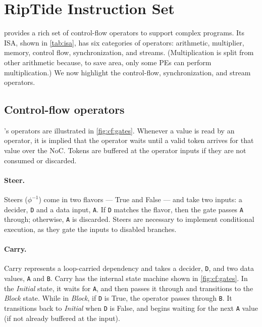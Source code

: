 \section{RipTide Instruction Set}
\label{sec:cf}



\riptide provides a rich set of control-flow operators to support complex programs.
% 
Its ISA, shown in \autoref{tab:isa}, has six categories of operators: arithmetic, multiplier, memory, control flow, synchronization, and streams.
%
(Multiplication is split from other arithmetic because, to save area, only some PEs can perform multiplication.)
%
We now highlight the control-flow, synchronization, and stream operators.

\subsection{Control-flow operators}
%
\riptide's operators are illustrated in \autoref{fig:cf:gates}.
%
Whenever a value is read by an operator, it is implied that the
operator waits until a valid token arrives for that value over the
NoC. Tokens are buffered at the operator inputs if they are not
consumed or discarded.

\figRipTideISA
\figRipTideCFGates

\figRipTideCompiler

\paragraph{Steer.} 
Steers ($\phi^{-1}$) come in two flavors --- True and False --- and take two inputs: a decider, {\tt D} and a data input, {\tt A}.
% 
If {\tt D} matches the flavor, then the gate passes {\tt A} through; otherwise, {\tt A} is discarded.
% 
Steers are necessary to implement conditional execution, as they gate the inputs to disabled branches.

\paragraph{Carry.}
\label{cf:carry}
% 
Carry represents a loop-carried dependency and takes a decider, {\tt D}, and two data values, {\tt A} and {\tt B}.
% 
Carry has the internal state machine shown in \autoref{fig:cf:gates}.
%
In the {\em Initial} state, it waits for {\tt A}, and then passes it through and transitions to the {\em Block} state.
%
While in {\em Block}, if {\tt D} is True, the operator passes through {\tt B}.
%
It transitions back to {\em Initial} when {\tt D} is False, and begins waiting for the next {\tt A} value (if not already buffered at the input).

